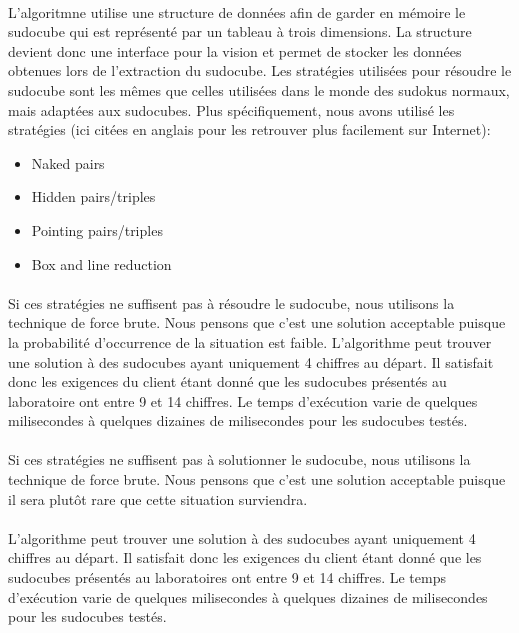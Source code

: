 \paragraph{}L'algoritmne utilise une structure de données afin de garder en mémoire le sudocube qui est représenté par un tableau à trois dimensions. La structure devient donc une interface pour la vision et permet de stocker les données obtenues lors de l'extraction du sudocube.
Les stratégies utilisées pour résoudre le sudocube sont les mêmes que celles  utilisées dans le monde des sudokus normaux, mais adaptées aux sudocubes. Plus spécifiquement, nous avons utilisé les stratégies (ici citées en anglais pour les retrouver plus facilement sur Internet):\newline
\begin{itemize}
\item Naked pairs
\item Hidden pairs/triples
\item Pointing pairs/triples
\item Box and line reduction
\end{itemize}
\paragraph{}Si ces stratégies ne suffisent pas à résoudre le sudocube, nous utilisons la technique de force brute. Nous pensons que c'est une solution acceptable puisque la probabilité d’occurrence de la situation est faible.
L'algorithme peut trouver une solution à des sudocubes ayant uniquement 4 chiffres au départ. Il satisfait donc les exigences du client étant donné que les sudocubes  présentés au laboratoire ont entre 9 et 14 chiffres. Le temps d'exécution varie de quelques milisecondes à quelques dizaines de milisecondes pour les sudocubes testés.

\paragraph{}Si ces stratégies ne suffisent pas à solutionner le sudocube, nous utilisons la technique de force brute. Nous pensons que c'est une solution acceptable puisque il sera plutôt rare que cette situation surviendra.

\paragraph{}L'algorithme peut trouver une solution à des sudocubes ayant uniquement 4 chiffres au départ. Il satisfait donc les exigences du client étant donné que les sudocubes présentés au laboratoires ont entre 9 et 14 chiffres. Le temps d'exécution varie de quelques milisecondes à quelques dizaines de milisecondes pour les sudocubes testés.

